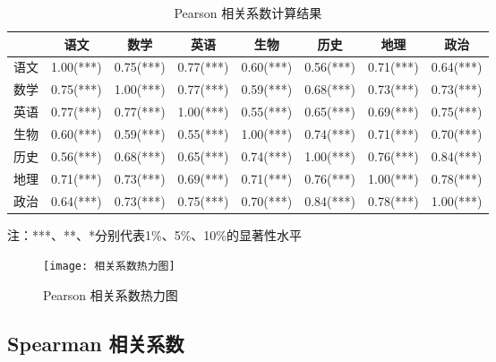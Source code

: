 \documentclass[withoutpreface]{cumcmthesis}
\begin{document}
\begin{table}[H]
    \centering
    \caption{Pearson 相关系数计算结果}\label{Tab:4}
    \begin{tabular}{|c|c|c|c|c|c|c|c|}
        \hline
           & 语文        & 数学        & 英语        & 生物        & 历史        & 地理        & 政治        \\
        \hline
        语文 & 1.00(***) & 0.75(***) & 0.77(***) & 0.60(***) & 0.56(***) & 0.71(***) & 0.64(***) \\
        \hline
        数学 & 0.75(***) & 1.00(***) & 0.77(***) & 0.59(***) & 0.68(***) & 0.73(***) & 0.73(***) \\
        \hline
        英语 & 0.77(***) & 0.77(***) & 1.00(***) & 0.55(***) & 0.65(***) & 0.69(***) & 0.75(***) \\
        \hline
        生物 & 0.60(***) & 0.59(***) & 0.55(***) & 1.00(***) & 0.74(***) & 0.71(***) & 0.70(***) \\
        \hline
        历史 & 0.56(***) & 0.68(***) & 0.65(***) & 0.74(***) & 1.00(***) & 0.76(***) & 0.84(***) \\
        \hline
        地理 & 0.71(***) & 0.73(***) & 0.69(***) & 0.71(***) & 0.76(***) & 1.00(***) & 0.78(***) \\
        \hline
        政治 & 0.64(***) & 0.73(***) & 0.75(***) & 0.70(***) & 0.84(***) & 0.78(***) & 1.00(***) \\
        \hline
    \end{tabular}

    \vspace{0.3cm}
    {注：***、**、*分别代表1\%、5\%、10\%的显著性水平}
\end{table}

\begin{figure}[H]
    \centering
    \texttt{[image: 相关系数热力图]}
    \caption{Pearson 相关系数热力图}
\end{figure}

\subsection{Spearman 相关系数}
\end{document}
